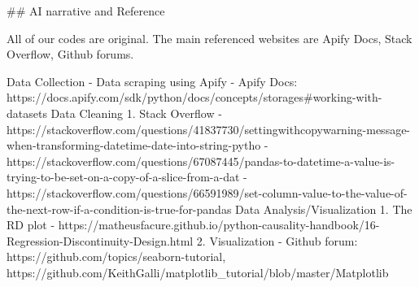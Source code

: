 ## AI narrative and Reference

All of our codes are original. The main referenced websites are Apify Docs, Stack Overflow, Github forums.

Data Collection
- Data scraping using Apify  - Apify Docs: https://docs.apify.com/sdk/python/docs/concepts/storages#working-with-datasets
Data Cleaning
1. Stack Overflow
	- https://stackoverflow.com/questions/41837730/settingwithcopywarning-message-when-transforming-datetime-date-into-string-pytho
	- https://stackoverflow.com/questions/67087445/pandas-to-datetime-a-value-is-trying-to-be-set-on-a-copy-of-a-slice-from-a-dat
	- https://stackoverflow.com/questions/66591989/set-column-value-to-the-value-of-the-next-row-if-a-condition-is-true-for-pandas
Data Analysis/Visualization
1. The RD plot - https://matheusfacure.github.io/python-causality-handbook/16-Regression-Discontinuity-Design.html
2. Visualization
	- Github forum: https://github.com/topics/seaborn-tutorial, https://github.com/KeithGalli/matplotlib_tutorial/blob/master/Matplotlib%